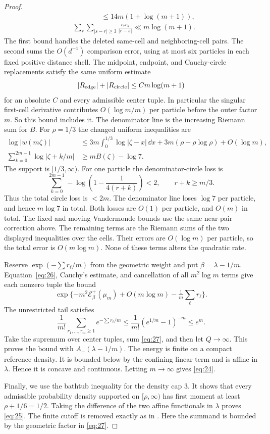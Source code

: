 \begin{proof}
\[\begin{aligned}
 &\hspace{4em}\le 14m(1+\log(m+1)),\\
 &\sum_r\sum_{|s-r|\ge3}\frac{c_rc_s}{|r-s|}
       \ll m\log(m+1).
 \end{aligned}
\]
The first bound handles the deleted same-cell and neighboring-cell pairs.
The second sums the $O(d^{-1})$ comparison error, using at most six particles
in each fixed positive distance shell. The midpoint, endpoint, and
Cauchy-circle replacements satisfy the same uniform estimate
\[
 |R_{\rm edge}|+|R_{\rm circle}|\le C m\log(m+1)
\]
for an absolute $C$ and every admissible center tuple. In particular the
singular first-cell derivative contributes $O(\log m/m)$ per particle before
the outer factor $m$. So this bound includes it.
The denominator line is the increasing Riemann sum for $B$. For $\rho=1/3$
the changed uniform inequalities are
\[
\begin{aligned}
 \log|w(m\zeta)|&\le3m\int_0^{1/3}\log|\zeta-x|\,\dd x
 +3m(\rho-\rho\log\rho)+O(\log m),\\
 \sum_{k=0}^{2m-1}\log|\zeta+k/m|&\ge mB(\zeta)-\log7.
\end{aligned}
\]
The support is $[1/3,\infty)$. For one particle the denominator-circle
loss is
\[
 \sum_{k=0}^{2m-1}-\log\left(1-\frac1{4(r+k)}\right)<2,
 \qquad r+k\ge m/3.
\]
Thus the total circle loss is $<2m$. The denominator line loses $\log7$ per
particle, and hence $m\log7$ in total. Both losses are $O(1)$ per particle,
and $O(m)$ in total.
The fixed and moving Vandermonde bounds use the same near-pair correction
above. The remaining terms are the Riemann sums of the two displayed
inequalities over the cells. Their errors are $O(\log m)$ per particle, so
the total error is $O(m\log m)$. None of these terms alters the quadratic
rate.

Reserve $\exp(-\sum r_\ell/m)$ from the geometric weight and put
$\beta=\lambda-1/m$. Equation~\eqref{eq:26}, Cauchy's estimate, and
cancellation of all $m^2\log m$ terms give each nonzero tuple the bound
\[
 \exp\{-m^2{\mathcal E}^+_\beta(\mu_m)+O(m\log m)
                 -\tfrac1m\sum_\ell r_\ell\}.
\]
The unrestricted tail satisfies
\begin{equation}
 \frac1{m!}\sum_{r_1,\ldots,r_m\ge1}
 e^{-\sum r_\ell/m}
 \le\frac1{m!}(e^{1/m}-1)^{-m}\le e^m.                    \label{eq:27}
\end{equation}
Take the supremum over center tuples, sum \eqref{eq:27}, and then let
$Q\to\infty$. This proves the bound with $A_+(\lambda-1/m)$. The energy is
finite on a compact reference density. It is bounded below by the
confining linear term and is affine in $\lambda$. Hence it is concave and
continuous. Letting $m\to\infty$ gives \eqref{eq:24}.

Finally, we use the bathtub inequality for the density cap $3$. It shows that
every admissible probability density supported on $[\rho,\infty)$ has
first moment at least $\rho+1/6=1/2$. Taking the difference of the two
affine functionals in $\lambda$ proves \eqref{eq:25}. The finite cutoff is
removed exactly as in \cite[Lemma~6.1]{ZhB}. Here the summand is bounded
by the geometric factor in \eqref{eq:27}.
\qedhere
\end{proof}


